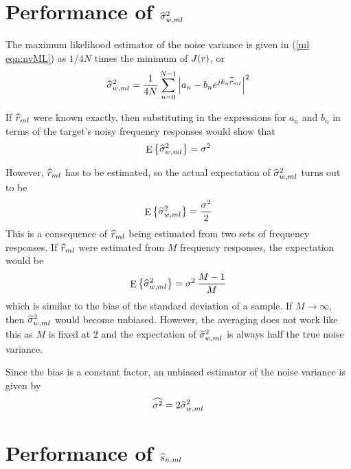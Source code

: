 \section{Performance of $\widehat{\sigma}^2_{{w},ml}$}

The maximum likelihood estimator of the noise variance is given in 
(\ref{ml eqn:nvML}) as $1/4N$ times the minimum of $J({r})$, or
\begin{equation}
\widehat{\sigma}^2_{{w},ml}=\frac{1}{4N}\sum_{n=0}^{N-1} \left|a_n-b_n{e^{jk_n\widehat{r}_{ml}}}\right|^2
\end{equation}

If $\widehat{r}_{ml}$ were known exactly, then substituting in the expressions for $a_n$
and $b_n$ in terms of the target's noisy frequency responses would show that
\begin{equation}
{\mathop{\rm E}\nolimits\left\{\widehat{\sigma}^2_{{w},ml}\right\}}={\sigma^2}
\end{equation}

However, $\widehat{r}_{ml}$ has to be estimated, so the actual expectation of $\widehat{\sigma}^2_{{w},ml}$
turns out to be
\begin{equation}
{\mathop{\rm E}\nolimits\left\{\widehat{\sigma}^2_{{w},ml}\right\}}=\frac{{\sigma^2}}{2}
\end{equation}
This is a consequence of $\widehat{r}_{ml}$ being estimated from two sets of 
frequency responses.  If $\widehat{r}_{ml}$ were estimated from $M$ frequency responses,
the expectation would be
\begin{equation}
{\mathop{\rm E}\nolimits\left\{\widehat{\sigma}^2_{{w},ml}\right\}}={\sigma^2}\,\frac{M-1}{M}
\end{equation}
which is similar to the bias of the standard deviation of a sample.  If
$M\to\infty$, then $\widehat{\sigma}^2_{{w},ml}$ would become unbiased.  However, the averaging
does not work like this as $M$ is fixed at $2$ and the expectation of
$\widehat{\sigma}^2_{{w},ml}$ is always half the true noise variance.

Since the bias is a constant factor, an unbiased estimator of the noise
variance is given by
\begin{equation}
\widehat{{\sigma^2}}=2\widehat{\sigma}^2_{{w},ml}
\end{equation}

\section{Performance of $\widehat{s}_{n,ml}$}

